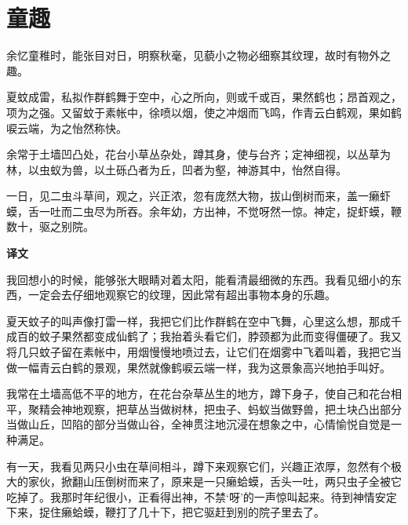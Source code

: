 \documentclass[12pt,UTF-8,openany,a4]{ctexbook}
\begin{document}
\chapter{童趣}

\begin{large}
    
    余忆童稚时，能张目对日，明察秋毫，见藐小之物必细察其纹理，故时有物外之趣。
    
    夏蚊成雷，私拟作群鹤舞于空中，心之所向，则或千或百，果然鹤也；昂首观之，项为之强。又留蚊于素帐中，徐喷以烟，使之冲烟而飞鸣，作青云白鹤观，果如鹤唳云端，为之怡然称快。
    
    余常于土墙凹凸处，花台小草丛杂处，蹲其身，使与台齐；定神细视，以丛草为林，以虫蚁为兽，以土砾凸者为丘，凹者为壑，神游其中，怡然自得。
    
    一日，见二虫斗草间，观之，兴正浓，忽有庞然大物，拔山倒树而来，盖一癞虾蟆，舌一吐而二虫尽为所吞。余年幼，方出神，不觉呀然一惊。神定，捉虾蟆，鞭数十，驱之别院。
\end{large}


\newpage

\begin{Large}
    \noindent\textbf{译文}
\end{Large}


\vspace{1em}

\begin{large}
    \yiwen 
    我回想小的时候，能够张大眼睛对着太阳，能看清最细微的东西。我看见细小的东西，一定会去仔细地观察它的纹理，因此常有超出事物本身的乐趣。
    
    夏天蚊子的叫声像打雷一样，我把它们比作群鹤在空中飞舞，心里这么想，那成千成百的蚊子果然都变成仙鹤了；我抬着头看它们，脖颈都为此而变得僵硬了。我又将几只蚊子留在素帐中，用烟慢慢地喷过去，让它们在烟雾中飞着叫着，我把它当做一幅青云白鹤的景观，果然就像鹤唳云端一样，我为这景象高兴地拍手叫好。
    
    我常在土墙高低不平的地方，在花台杂草丛生的地方，蹲下身子，使自己和花台相平，聚精会神地观察，把草丛当做树林，把虫子、蚂蚁当做野兽，把土块凸出部分当做山丘，凹陷的部分当做山谷，全神贯注地沉浸在想象之中，心情愉悦自觉是一种满足。
    
    有一天，我看见两只小虫在草间相斗，蹲下来观察它们，兴趣正浓厚，忽然有个极大的家伙，掀翻山压倒树而来了，原来是一只癞蛤蟆，舌头一吐，两只虫子全被它吃掉了。我那时年纪很小，正看得出神，不禁‘呀’的一声惊叫起来。待到神情安定下来，捉住癞蛤蟆，鞭打了几十下，把它驱赶到别的院子里去了。
    
\end{large}
\end{document}
